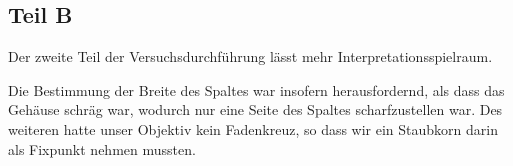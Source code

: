 \documentclass[12pt,a4paper,titlepage,headinclude,bibtotoc]{scrartcl}
\begin{document}
\subsection{Teil B}
Der zweite Teil der Versuchsdurchführung lässt mehr Interpretationsspielraum.

Die Bestimmung der Breite des Spaltes war insofern herausfordernd, als dass das Gehäuse schräg war, wodurch nur eine Seite des Spaltes scharfzustellen war.
Des weiteren hatte unser Objektiv kein Fadenkreuz, so dass wir ein Staubkorn darin als Fixpunkt nehmen mussten.




\end{document}
